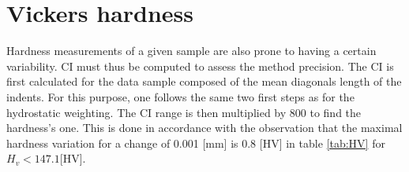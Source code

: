 \section{Vickers hardness}

Hardness measurements of a given sample are also prone to having a certain variability. CI must thus be computed to assess the method precision. The CI is first calculated for the data sample composed of the mean diagonals length of the indents. For this purpose, one follows the same two first steps as for the hydrostatic weighting. The CI range is then multiplied by 800 to find the hardness's one. This is done in accordance with the observation that the maximal hardness variation for a change of 0.001 [mm] is 0.8 [HV] in table \ref{tab:HV} for $H_v<147.1 $[HV].%